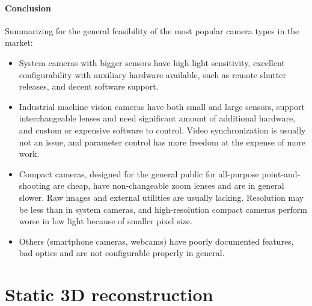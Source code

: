 
\paragraph{Conclusion}
Summarizing for the general feasibility of the most popular camera types in the market:

\begin{itemize}
	\item System cameras with bigger sensors have high light sensitivity, excellent configurability with auxiliary hardware available, such as remote shutter releases, and decent software support.
	\item Industrial machine vision cameras have both small and large sensors, support interchangeable lenses and need significant amount of additional hardware, and custom or expensive software to control. Video synchronization is usually not an issue, and parameter control has more freedom at the expense of more work.
	\item Compact cameras, designed for the general public for all-purpose point-and-shooting are cheap, have non-changeable zoom lenses and are in general slower. Raw images and external utilities are usually lacking. Resolution may be less than in system cameras, and high-resolution compact cameras perform worse in low light because of smaller pixel size.
	\item Others (smartphone cameras, webcams) have poorly documented features, bad optics and are not configurable properly in general.
\end{itemize}



\clearpage
\section{Static 3D reconstruction} \label{sec:static3d} %

